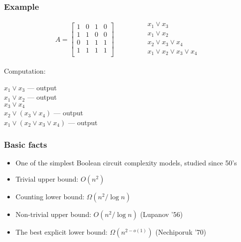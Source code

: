 \documentclass{beamer}
\begin{document}
\begin{frame}
\frametitle{Example}

\[
  A =\begin{bmatrix}
    1 & 0 & 1 & 0 \\
    1 & 1 & 0 & 0 \\
    0 & 1 & 1 & 1 \\
    1 & 1 & 1 & 1 \\
  \end{bmatrix}
 \ \ \ \ \ \ \ \ \ \ \ \ \ \ \ \ \ \ \ \ \begin{array}{l}
    x_1 \vee x_3 \\
    x_1 \vee x_2 \\
    x_2 \vee x_3 \vee x_4 \\
    x_1 \vee x_2 \vee x_3 \vee x_4\\
  \end{array}
  \]

\medskip
Computation:

$x_1 \vee x_3$ --- output\\
$x_1 \vee x_2$ --- output\\
$x_3 \vee x_4$\\
$x_2 \vee (x_3 \vee x_4)$ --- output\\
$x_1 \vee (x_2 \vee x_3 \vee x_4)$ --- output

\end{frame}


\begin{frame}
\frametitle{Basic facts}

\begin{itemize}%
\item One of the simplest Boolean circuit complexity models, studied since 50's
\item Trivial upper bound: $O(n^2)$
\item Counting lower bound: $\Omega(n^2/\log n)$
\item Non-trivial upper bound: $O(n^2/\log n)$ (Lupanov '56)
\item The best explicit lower bound: $\Omega(n^{2 - o(1)})$ (Nechiporuk '70)
\end{itemize}



\end{frame}
\end{document}
